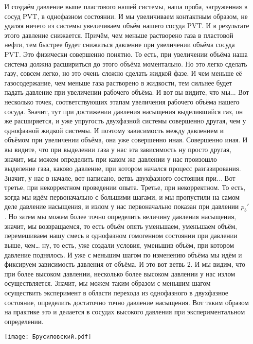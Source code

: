 \documentclass[main.tex]{subfiles}
\begin{document}
И создаём давление выше пластового нашей системы, наша проба, загруженная в сосуд PVT, в однофазном состоянии.
И мы увеличиваем контактным образом, не удаляя ничего из системы увеличиваем объём нашего сосуда PVT.
И в результате этого давление снижается.
Причём, чем меньше растворено газа в пластовой нефти, тем быстрее будет снижаться давление при увеличении объёма сосуда PVT.
Это физически совершенно понятно.
То есть, при увеличении объёма наша система должна расшириться до этого объёма моментально.
Но это легко сделать газу, совсем легко, но это очень сложно сделать жидкой фазе.
И чем меньше её газосодержание, чем меньше газа растворено в жидкости, тем сильнее будет падать давление при увеличении рабочего объёма.
И вот вы видите, что мы...
Вот несколько точек, соответствующих этапам увеличения рабочего объёма нашего сосуда.
Значит, тут при достижении давления насыщения выделившийся газ, он же расширяется, и уже упругость двухфазной системы совершенно другая, чем у однофазной жидкой системы.
И поэтому зависимость между давлением и объёмом при увеличении объёма, она уже совершенно иная.
Совершенно иная.
И вы видите, что при выделении газа у нас эта зависимость ну просто другая, значит, мы можем определить при каком же давлении у нас произошло выделение газа, каково давление, при котором начался процесс разгазирования.
Значит, у нас в начале, вот написано, ветвь двухфазного состояния при...
Вот третье, при некорректном проведении опыта.
Третье, при некорректном.
То есть, когда мы идём первоначально с большими шагами, и мы пропустили на самом деле давление насыщения, и излом у нас первоначально показан при давлении $p_b'$.
Но затем мы можем более точно определить величину давления насыщения, значит, мы возвращаемся, то есть объём опять уменьшаем, уменьшаем объём, перемешиваем нашу смесь в однофазном гомогенном состоянии при давлении выше, чем… ну, то есть, уже создали условия, уменьшив объём, при котором давление поднялось.
И уже с меньшим шагом по изменению объёма мы идём и фиксируем зависимость давления от объёма.
И это вот ветвь 2.
И мы видим, что при более высоком давлении, несколько более высоком давлении у нас излом осуществляется.
Значит, мы можем таким образом с меньшим шагом осуществить эксперимент в области перехода из однофазного в двухфазное состояние, определить достаточно точно давление насыщения.
Вот таким образом на практике это и делается в сосудах высокого давления при экспериментальном определении.

\begin{center}
\texttt{[image: Брусиловский.pdf]}
\end{center}
\end{document}
